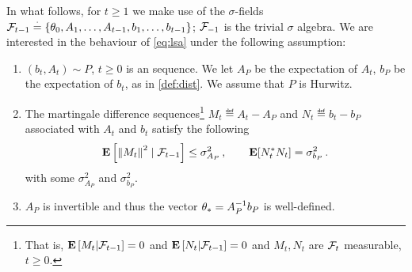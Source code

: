 In what follows, for $t\ge1$ we make use of the $\sigma$-fields $\mathcal{F}_{t-1}\stackrel{\cdot}{=}\{\theta_0,A_1,\ldots, A_{t-1}, b_1,\ldots, b_{t-1}\}$; $\mathcal{F}_{-1}$ is the trivial $\sigma$ algebra. 
We are interested in the behaviour of \eqref{eq:lsa} under the following assumption:
\begin{assumption}\label{assmp:lsa}
\begin{enumerate}[leftmargin=*, before = \leavevmode\vspace{-\baselineskip}]
\item \label{dist} $(b_t, A_t)\sim P$, $t\geq 0$ is an \iid sequence.
We let $A_P$ be the expectation of $A_t$, $b_P$ be the expectation of $b_t$, as in \cref{def:dist}.
We assume that $P$ is Hurwitz.
\item \label{matvar} The martingale difference sequences\footnote{That is, $\mathbf{E}\left[M_t|\mathcal{F}_{t-1}\right]=0$ and $\mathbf{E}\left[N_t|\mathcal{F}_{t-1}\right]=0$ and $M_t,N_t$ are $\mathcal{F}_t$ measurable, $t\ge 0$.} $M_t\eqdef A_t-A_{P}$ and $N_t\eqdef b_t-b_{P}$ associated with $A_t$ and $b_t$ satisfy the following 
\begin{align*}
	\mathbf{E}\left[ \left\| M_t\right\|^2\mid\mathcal{F}_{t-1}\right]\leq \sigma^2_{A_P}\,, \qquad 
	\mathbf{E}[N_t^* N_t]=\sigma^2_{b_P}\,.
\end{align*}
with some $\sigma^2_{A_P}$ and $\sigma^2_{b_P}$. 
\item $A_P$ is invertible and thus the vector $\theta_*=A^{-1}_Pb_P$ is well-defined. 
\end{enumerate}
\end{assumption}
